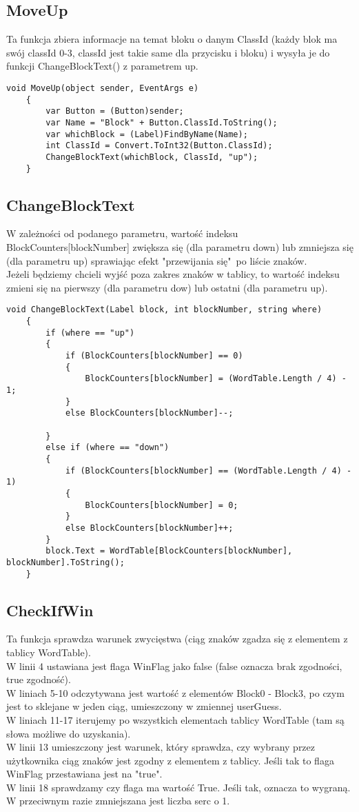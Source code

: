 \subsection{MoveUp}
Ta funkcja zbiera informacje na temat bloku o danym ClassId (każdy blok ma swój classId 0-3, classId jest takie same dla przycisku i bloku) i wysyła je do funkcji ChangeBlockText() z parametrem up. 
\begin{lstlisting}[caption=MoveUp]
	void MoveUp(object sender, EventArgs e)
	{
		var Button = (Button)sender;
		var Name = "Block" + Button.ClassId.ToString();
		var whichBlock = (Label)FindByName(Name);
		int ClassId = Convert.ToInt32(Button.ClassId);
		ChangeBlockText(whichBlock, ClassId, "up");
	}
\end{lstlisting}

\subsection{ChangeBlockText}
W zależności od podanego parametru, wartość indeksu BlockCounters[blockNumber] zwiększa się (dla parametru down) lub zmniejsza się (dla parametru up) sprawiając efekt "przewijania się"~po liście znaków. 
\\Jeżeli będziemy chcieli wyjść poza zakres znaków w tablicy, to wartość indeksu zmieni się na pierwszy (dla parametru dow) lub ostatni (dla parametru up).
\begin{lstlisting}[caption=ChangeBlockText]
	        void ChangeBlockText(Label block, int blockNumber, string where)
	{
		if (where == "up")
		{
			if (BlockCounters[blockNumber] == 0)
			{
				BlockCounters[blockNumber] = (WordTable.Length / 4) - 1;
			}
			else BlockCounters[blockNumber]--;
			
		}
		else if (where == "down")
		{
			if (BlockCounters[blockNumber] == (WordTable.Length / 4) - 1)
			{
				BlockCounters[blockNumber] = 0;
			}
			else BlockCounters[blockNumber]++;
		}
		block.Text = WordTable[BlockCounters[blockNumber], blockNumber].ToString();
	}
\end{lstlisting}

\subsection{CheckIfWin}
Ta funkcja sprawdza warunek zwycięstwa (ciąg znaków zgadza się z elementem z tablicy WordTable). 
\\W linii 4 ustawiana jest flaga WinFlag jako false (false oznacza brak zgodności, true zgodność). 
\\W liniach 5-10 odczytywana jest wartość z elementów Block0 - Block3, po czym jest to sklejane w jeden ciąg, umieszczony w zmiennej userGuess.
\\W liniach 11-17 iterujemy po wszystkich elementach tablicy WordTable (tam są słowa możliwe do uzyskania). 
\\W linii 13 umieszczony jest warunek, który sprawdza, czy wybrany przez użytkownika ciąg znaków jest zgodny z elementem z tablicy. Jeśli tak to flaga WinFlag przestawiana jest na "true".
\\W linii 18 sprawdzamy czy flaga ma wartość True. Jeśli tak, oznacza to wygraną. W przeciwnym razie zmniejszana jest liczba serc o 1.

